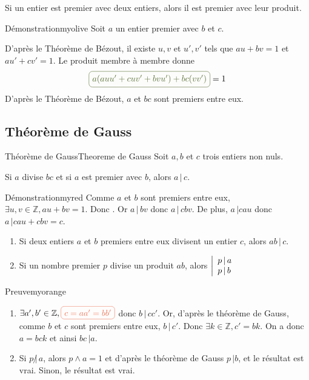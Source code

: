     \begin{prop}{}{}
        Si un entier est premier avec deux entiers, alors il est premier avec leur produit.
    \end{prop}

    \begin{demo}{Démonstration}{myolive}
        Soit $a$ un entier premier avec $b$ et $c$. 

        D’après le Théorème de Bézout, il existe $u,v$ et $u',v'$ tels que $au + bv = 1$ et $au' + cv' =1$. Le produit membre à membre donne 
        \[ \lilbox{myolive}{$ a(auu' + cuv' + bvu') + bc(vv') $} = 1 \] 
        D’après le Théorème de Bézout, $a$ et $bc$ sont premiers entre eux.
    \end{demo}

\subsection{Théorème de Gauss}

    \begin{theo}{Théorème de Gauss}{Theoreme de Gauss}
        Soit $a,b$ et $c$ trois entiers non nuls. 
        
        Si $a$ divise $bc$ et si $a$ est premier avec $b$, alors $a \, | \, c$.
    \end{theo}

    \begin{demo}{Démonstration}{myred}
        Comme $a$ et $b$ sont premiers entre eux, $\exists u,v \in \mathbb{Z}, au + bv = 1$. Donc . Or $a \, | \, bv$ donc $a \, | \, cbv$. De plus, $a \, | cau$ donc $a \, | cau + cbv = c$.
    \end{demo}

    \begin{coro}{}{}
        \begin{enumerate}
            \item Si deux entiers $a$ et $b$ premiers entre eux divisent un entier $c$, alors $ab \, | \, c$.
            \item Si un nombre premier $p$ divise un produit $ab$, alors $\ou{p \, | \, a}{p \, | \, b}$
        \end{enumerate}
    \end{coro}

    \begin{demo}{Preuve}{myorange}
        \begin{enumerate}
            \item $\exists a',b' \in \mathbb{Z}, \lilbox{myorange}{$c = aa' = bb'$}$ donc $b \, | \, cc'$. Or, d’après le théorème de Gauss, comme $b$ et $c$ sont premiers entre eux, $b \, | \, c'$. Donc $\exists k \in \mathbb{Z} , c' = bk$. On a donc $a = bck$ et ainsi $bc \, | a$.
            \item Si $p \, \not| \, a$, alors $p \wedge a = 1$ et d’après le théorème de Gauss $p \, | b$, et le résultat est vrai. Sinon, le résultat est vrai.
        \end{enumerate}
    \end{demo}

